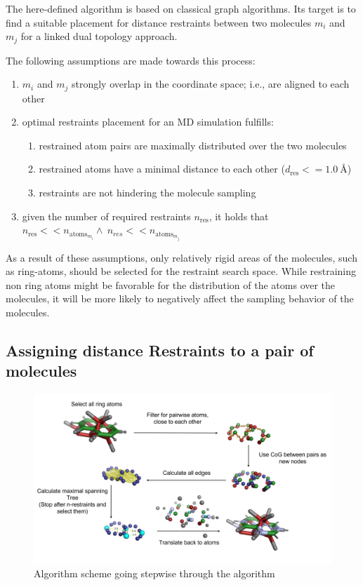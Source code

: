 The here-defined algorithm is based on classical graph algorithms. Its target is to find a suitable placement for distance restraints between two molecules $m_i$ and $m_j$ for a linked dual topology approach.

The following assumptions are made towards this process:
\begin{enumerate}
    \item $m_i$ and $m_j$ strongly overlap in the coordinate space; i.e., are aligned to each other
    \item optimal restraints placement for an MD simulation fulfills:
    \begin{enumerate}
        \item restrained atom pairs are maximally distributed over the two molecules
        \item restrained atoms have a minimal distance to each other ($d_{\text{res}} <= 1.0~\text{\AA}$)
        \item restraints are not hindering the molecule sampling
    \end{enumerate}
    \item given the number of required restraints $n_{\text{res}}$, it holds that $n_{\text{res}} << n_{\text{atoms}_{m_i}} \wedge~n_{res} << n_{\text{atoms}_{m_j}}$ 
\end{enumerate}
As a result of these assumptions, only relatively rigid areas of the molecules, such as ring-atoms, should be selected for the restraint search space. While restraining non ring atoms might be favorable for the distribution of the atoms over the molecules, it will be more likely to negatively affect the sampling behavior of the molecules.

\subsection{Assigning distance Restraints  to a pair of molecules}
\begin{figure}
    \centering
    \includegraphics[width=\textwidth]{fig/theory/AlgorithmScheme.png}
    \caption{Algorithm scheme going stepwise through the algorithm}
    \label{fig:algorithmScheme}
\end{figure}

